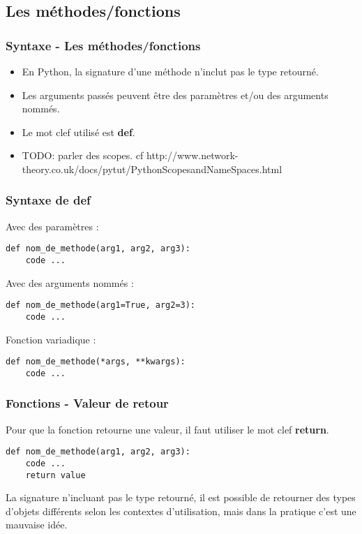 \subsection{Les méthodes/fonctions}
\begin{frame}[fragile]
  \frametitle{Syntaxe - Les méthodes/fonctions}
  \begin{itemize}
    \item En Python, la signature d'une méthode n'inclut pas le type retourné.
    \item Les arguments passés peuvent être des paramètres et/ou des arguments nommés.
    \item Le mot clef utilisé est {\bf def}.
    \item TODO: parler des scopes. cf http://www.network-theory.co.uk/docs/pytut/PythonScopesandNameSpaces.html
  \end{itemize}
\end{frame}

\begin{frame}[fragile]
  \frametitle{Syntaxe de def}
Avec des paramètres :
  \begin{lstlisting}
def nom_de_methode(arg1, arg2, arg3):
    code ...
  \end{lstlisting}
Avec des arguments nommés :
  \begin{lstlisting}
def nom_de_methode(arg1=True, arg2=3):
    code ...
  \end{lstlisting}
Fonction variadique :
  \begin{lstlisting}
def nom_de_methode(*args, **kwargs):
    code ...
  \end{lstlisting}
\end{frame}

\begin{frame}[fragile]
  \frametitle{Fonctions - Valeur de retour}
Pour que la fonction retourne une valeur, il faut utiliser le mot clef {\bf return}.
  \begin{lstlisting}
def nom_de_methode(arg1, arg2, arg3):
    code ...
    return value
  \end{lstlisting}

La signature n'incluant pas le type retourné, il est possible de retourner des types d'objets différents selon les contextes d'utilisation, mais dans la pratique c'est une mauvaise idée.
\end{frame}

